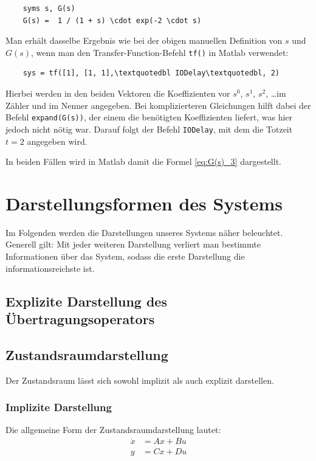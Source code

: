 \begin{verbatim}
    syms s, G(s)
    G(s) =  1 / (1 + s) \cdot exp(-2 \cdot s)
\end{verbatim}

Man erhält dasselbe Ergebnis wie bei der obigen manuellen Definition von $s$ und $G(s)$, wenn man den Transfer-Function-Befehl \texttt{tf()} in Matlab verwendet:

\begin{verbatim}
    sys = tf([1], [1, 1],\textquotedbl IODelay\textquotedbl, 2)
\end{verbatim}

Hierbei werden in den beiden Vektoren die Koeffizienten vor $s^0$, $s^1$, $s^2$, \ldots im Zähler und im Nenner angegeben. Bei komplizierteren Gleichungen hilft dabei der Befehl \texttt{expand(G(s))}, der einem die benötigten Koeffizienten liefert, was hier jedoch nicht nötig war. Darauf folgt der Befehl \texttt{\textquotedbl IODelay\textquotedbl}, mit dem die Totzeit $t = 2$ angegeben wird.

In beiden Fällen wird in Matlab damit die Formel \ref{eq:G(s)_3} dargestellt.

\section{Darstellungsformen des Systems}
Im Folgenden werden die Darstellungen unseres Systems näher beleuchtet. Generell gilt: Mit jeder weiteren Darstellung verliert man bestimmte Informationen über das System, sodass die erste Darstellung die informationsreichste ist.

\subsection{Explizite Darstellung des Übertragungsoperators}

\subsection{Zustandsraumdarstellung}
Der Zustandsraum lässt sich sowohl implizit als auch explizit darstellen.

\subsubsection{Implizite Darstellung}

Die allgemeine Form der Zustandsraumdarstellung lautet:
\begin{align*}
    \dot x & = Ax + Bu \nonumber \\
    y & = Cx + Du
\end{align*}

